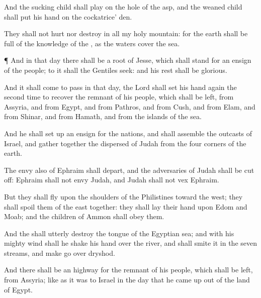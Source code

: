 {And the sucking
child shall
play on the
hole of the
asp, and the weaned
child shall
put his
hand on the
cockatrice’
den.

They shall not
hurt nor
destroy in all my
holy
mountain: for the
earth shall be
full of the
knowledge of the
{}, as the
waters
cover the
sea.


\par }{\PP {}¶ And in that
day there shall be a
root of
Jesse, which shall
stand for an
ensign of the
people; to it shall the
Gentiles
seek: and his
rest shall be
glorious.

And it shall come to pass in that
day,
{} the
Lord shall
set his
hand
again the second
time to
recover the
remnant of his
people, which shall be
left, from
Assyria, and from
Egypt, and from
Pathros, and from
Cush, and from
Elam, and from
Shinar, and from
Hamath, and from the
islands of the
sea.

And he shall set
up an
ensign for the
nations, and shall
assemble the
outcasts of
Israel, and gather
together the
dispersed of
Judah from the
four
corners of the
earth.

The
envy also of
Ephraim shall
depart, and the
adversaries of
Judah shall be cut
off:
Ephraim shall not
envy
Judah, and
Judah shall not
vex
Ephraim.

But they shall
fly upon the
shoulders of the
Philistines toward the
west; they shall
spoil
them of the
east
together: they shall
lay their
hand upon
Edom and
Moab; and the
children of
Ammon shall
obey them.

And the
{} shall utterly
destroy the
tongue of the
Egyptian
sea; and with his
mighty
wind shall he
shake his
hand over the
river, and shall
smite it in the
seven
streams, and make
{} go
over
dryshod.

And there shall be an
highway for the
remnant of his
people,
which shall be
left, from
Assyria; like as it was to
Israel in the
day that he came
up out of the
land of
Egypt.




}
